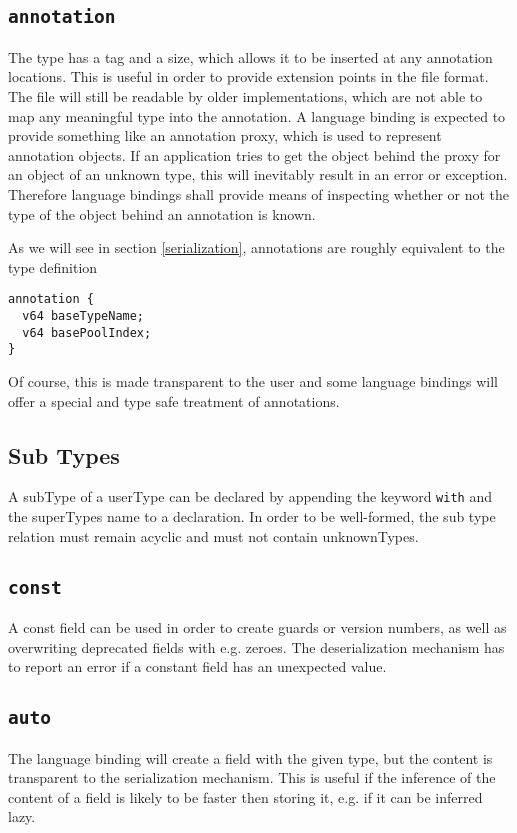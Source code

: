\documentclass[a4paper,10pt]{article}
\begin{document}
\subsection{\texttt{annotation}}
The type has a tag and a size, which allows it to be inserted at any annotation locations. This is useful in order to provide extension points in the file format. The file will still be readable by older implementations, which are not able to map any meaningful type into the annotation. A language binding is expected to provide something like an annotation proxy, which is used to represent annotation objects. If an application tries to get the object behind the proxy for an object of an unknown type, this will inevitably result in an error or exception. Therefore language bindings shall provide means of inspecting whether or not the type of the object behind an annotation is known.

As we will see in section \ref{serialization}, annotations are roughly equivalent to the type definition
\begin{verbatim}
annotation {
  v64 baseTypeName;
  v64 basePoolIndex;
}
\end{verbatim}
Of course, this is made transparent to the user and some language bindings will offer a special and type safe treatment of annotations.

\subsection{Sub Types}
A \gls{subType} of a \gls{userType} can be declared by appending the keyword \texttt{with} and the \gls{superType}s name to a declaration. In order to be well-formed, the sub type relation must remain acyclic and must not contain \glspl{unknownType}.

\subsection{\texttt{const}}
A const field can be used in order to create guards or version numbers, as well as overwriting deprecated fields with e.g. zeroes. The deserialization mechanism has to report an error if a constant field has an unexpected value.

\subsection{\texttt{auto}}
The language binding will create a field with the given type, but the content is transparent to the serialization mechanism. This is useful if the inference of the content of a field is likely to be faster then storing it, e.g. if it can be inferred lazy.
\end{document}
